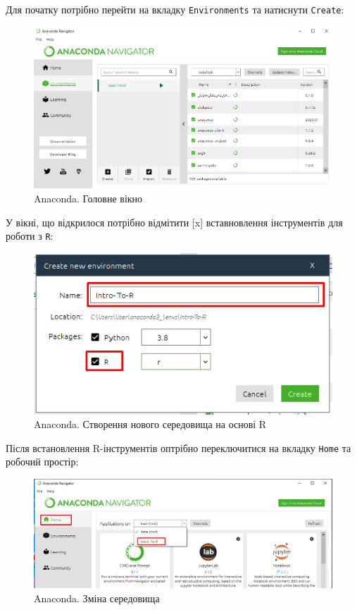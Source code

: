 \documentclass[
]{book}
\begin{document}
Для початку потрібно перейти на вкладку \texttt{Environments} та натиснути \texttt{Create}:

\begin{figure}
\includegraphics[width=14.12in]{images/chapter1/anaconda_2} \caption{Anaconda. Головне вікно}\label{fig:unnamed-chunk-24}
\end{figure}

У вікні, що відкрилося потрібно відмітити {[}x{]} вставновлення інструментів для роботи з \texttt{R}:

\begin{figure}
\includegraphics[width=6.49in]{images/chapter1/anaconda_3} \caption{Anaconda. Створення нового середовища на основі R}\label{fig:unnamed-chunk-25}
\end{figure}

Після встановлення R-інструментів оптрібно переключитися на вкладку \texttt{Home} та робочий простір:

\begin{figure}
\includegraphics[width=14.67in]{images/chapter1/anaconda_4} \caption{Anaconda. Зміна середовища}\label{fig:unnamed-chunk-26}
\end{figure}
\end{document}
